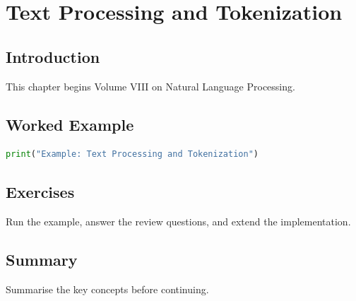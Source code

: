 \chapter{Text Processing and Tokenization}
\label{chap:vol8-2}



\section{Introduction}
This chapter begins Volume VIII on Natural Language Processing.

\section{Worked Example}
\begin{lstlisting}[language=Python]
print("Example: Text Processing and Tokenization")
\end{lstlisting}

\section{Exercises}
\begin{exercise}
Run the example, answer the review questions, and extend the implementation.
\end{exercise}

\section{Summary}
Summarise the key concepts before continuing.
